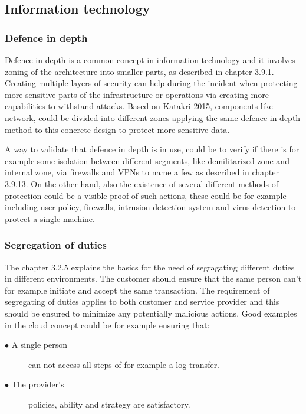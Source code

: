 \documentclass{article}
\begin{document}
\subsection{Information technology}


\subsubsection{Defence in depth}
Defence in depth is a common concept in information technology and it involves zoning of the architecture into smaller parts, as described in chapter 3.9.1. Creating multiple layers of security can help during the incident when protecting more sensitive parts of the infrastructure or operations via creating more capabilities to withstand attacks.
Based on Katakri 2015, components like network, could be divided into different zones applying the same defence-in-depth method to this concrete design to protect more sensitive data.
\par
A way to validate that defence in depth is in use, could be to verify if there is for example some isolation between different segments, like demilitarized zone and internal zone, via firewalls and VPNs to name a few as described in chapter 3.9.13. On the other hand, also the existence of several different methods of protection could be a visible proof of such actions, these could be for example including user policy, firewalls, intrusion detection system and virus detection to protect a single machine.

\subsubsection{Segregation of duties}
The chapter 3.2.5 explains the basics for the need of segragating different duties in different environments. The customer should ensure that the same person can't for example initiate and accept the same transaction. The requirement of segregating of duties applies to both customer and service provider and this should be ensured to minimize any potentially malicious actions.
Good examples in the cloud concept could be for example ensuring that:
\begin{description}
	\item[$\bullet$ A single person] can not access all steps of for example a log transfer.
	\item[$\bullet$ The provider's] policies, ability and strategy are satisfactory.
\end{description}
\end{document}
